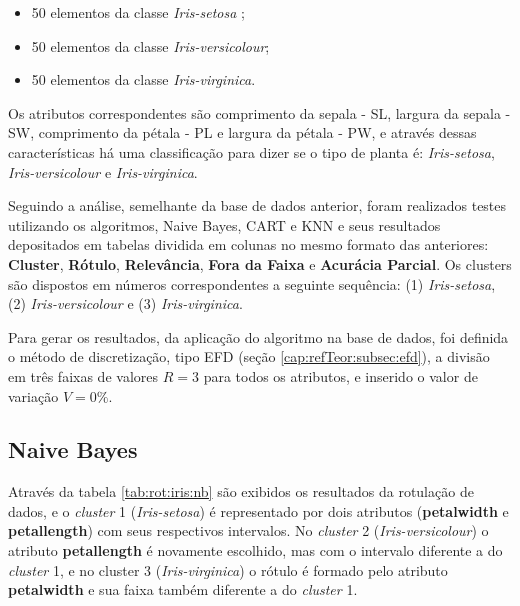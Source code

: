 \begin{itemize}[noitemsep]
 \item 50 elementos da classe \textit{Iris-setosa} ;
 \item 50 elementos da classe \textit{Iris-versicolour};
 \item 50 elementos da classe \textit{Iris-virginica}.
\end{itemize}

Os atributos correspondentes são comprimento da sepala - SL, largura da sepala - SW, comprimento da pétala - PL e largura da pétala - PW, e através dessas características há uma classificação para dizer se o tipo de planta é: \textit{Iris-setosa}, \textit{Iris-versicolour} e \textit{Iris-virginica}.

Seguindo a análise, semelhante da base de dados anterior, foram realizados testes utilizando os algoritmos, Naive Bayes, CART e KNN e seus resultados depositados em tabelas dividida em colunas no mesmo formato das anteriores: \textbf{Cluster}, \textbf{Rótulo}, \textbf{Relevância}, \textbf{Fora da Faixa} e \textbf{Acurácia Parcial}. Os clusters são dispostos em números correspondentes a seguinte sequência: (1) \textit{Iris-setosa}, (2) \textit{Iris-versicolour} e (3) \textit{Iris-virginica}.
 

Para gerar os resultados, da aplicação do algoritmo na base de dados, foi definida o método de discretização, tipo EFD (seção \ref{cap:refTeor:subsec:efd}), a divisão em três faixas de valores ${R = 3}$ para todos os atributos, e inserido o valor de variação ${V=0\%}$. 


\subsection{Naive Bayes} \label{cap:resultados:ssec:iris:nb}

Através da tabela \ref{tab:rot:iris:nb}  são exibidos os resultados da rotulação de dados, e o \textit{cluster} 1 (\textit{Iris-setosa}) é representado por dois atributos (\textbf{petalwidth} e \textbf{petallength}) com seus respectivos intervalos. No \textit{cluster} 2 (\textit{Iris-versicolour}) o atributo \textbf{petallength} é novamente escolhido, mas com o intervalo diferente a do \textit{cluster} 1, e no cluster 3 (\textit{Iris-virginica}) o rótulo é formado pelo atributo \textbf{petalwidth} e sua faixa também diferente a do \textit{cluster} 1.


